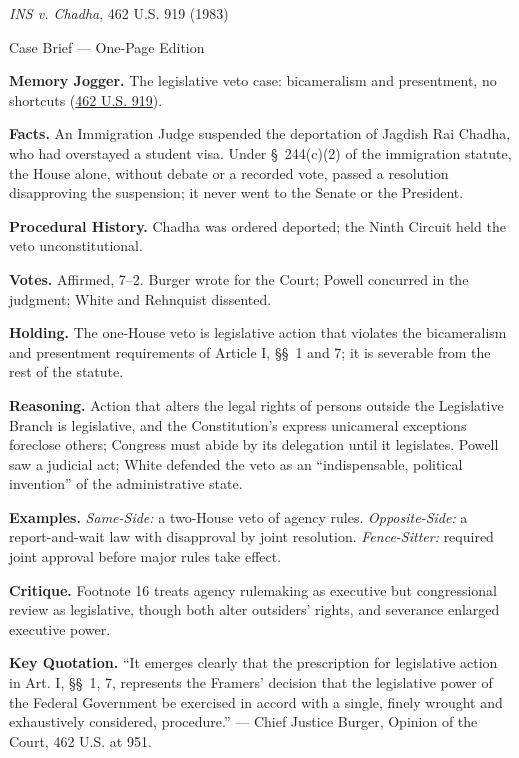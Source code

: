 \documentclass[12pt]{article}
\begin{document}
\begin{center}
{\Large \textit{INS v. Chadha}, 462 U.S. 919 (1983)\par}
\vspace{0.3em}
{\normalsize Case Brief --- One-Page Edition\par}
\end{center}

\textbf{Memory Jogger.} The legislative veto case: bicameralism and presentment, no shortcuts (\href{https://supreme.justia.com/cases/federal/us/462/919/}{462 U.S. 919}).

\textbf{Facts.} An Immigration Judge suspended the deportation of Jagdish Rai Chadha, who had overstayed a student visa. Under \S~244(c)(2) of the immigration statute, the House alone, without debate or a recorded vote, passed a resolution disapproving the suspension; it never went to the Senate or the President.

\textbf{Procedural History.} Chadha was ordered deported; the Ninth Circuit held the veto unconstitutional.

\textbf{Votes.} Affirmed, 7--2. Burger wrote for the Court; Powell concurred in the judgment; White and Rehnquist dissented.

\textbf{Holding.} The one-House veto is legislative action that violates the bicameralism and presentment requirements of Article I, \S\S~1 and 7; it is severable from the rest of the statute.

\textbf{Reasoning.} Action that alters the legal rights of persons outside the Legislative Branch is legislative, and the Constitution's express unicameral exceptions foreclose others; Congress must abide by its delegation until it legislates. Powell saw a judicial act; White defended the veto as an ``indispensable, political invention'' of the administrative state.

\textbf{Examples.} \emph{Same-Side:} a two-House veto of agency rules. \emph{Opposite-Side:} a report-and-wait law with disapproval by joint resolution. \emph{Fence-Sitter:} required joint approval before major rules take effect.

\textbf{Critique.} Footnote 16 treats agency rulemaking as executive but congressional review as legislative, though both alter outsiders' rights, and severance enlarged executive power.

\textbf{Key Quotation.} ``It emerges clearly that the prescription for legislative action in Art. I, \S\S~1, 7, represents the Framers' decision that the legislative power of the Federal Government be exercised in accord with a single, finely wrought and exhaustively considered, procedure.'' --- Chief Justice Burger, Opinion of the Court, 462 U.S. at 951.
\end{document}
